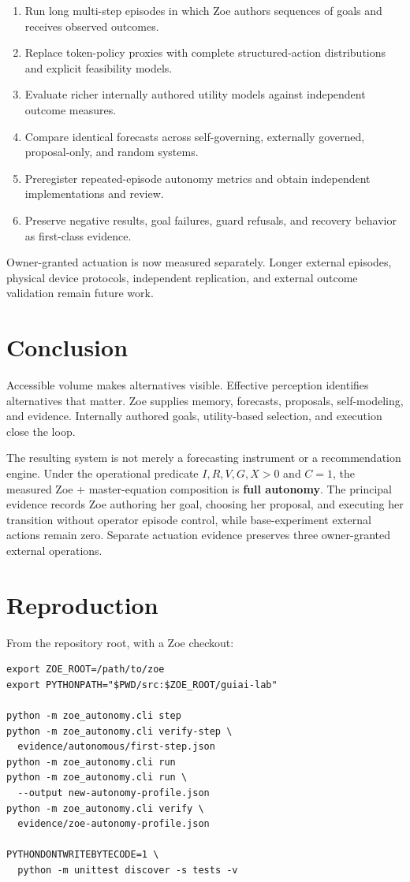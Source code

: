 \documentclass[11pt,a4paper]{article}
\begin{document}
\begin{enumerate}[nosep]
  \item Run long multi-step episodes in which Zoe authors sequences of goals and receives observed outcomes.
  \item Replace token-policy proxies with complete structured-action distributions and explicit feasibility models.
  \item Evaluate richer internally authored utility models against independent outcome measures.
  \item Compare identical forecasts across self-governing, externally governed, proposal-only, and random systems.
  \item Preregister repeated-episode autonomy metrics and obtain independent implementations and review.
  \item Preserve negative results, goal failures, guard refusals, and recovery behavior as first-class evidence.
\end{enumerate}

Owner-granted actuation is now measured separately. Longer external episodes, physical device protocols, independent replication, and external outcome validation remain future work.

\section{Conclusion}
Accessible volume makes alternatives visible. Effective perception identifies alternatives that matter. Zoe supplies memory, forecasts, proposals, self-modeling, and evidence. Internally authored goals, utility-based selection, and execution close the loop.

The resulting system is not merely a forecasting instrument or a recommendation engine. Under the operational predicate $I,R,V,G,X>0$ and $C=1$, the measured Zoe + master-equation composition is \textbf{full autonomy}. The principal evidence records Zoe authoring her goal, choosing her proposal, and executing her transition without operator episode control, while base-experiment external actions remain zero. Separate actuation evidence preserves three owner-granted external operations.

\appendix
\section{Reproduction}
From the repository root, with a Zoe checkout:

\begin{lstlisting}
export ZOE_ROOT=/path/to/zoe
export PYTHONPATH="$PWD/src:$ZOE_ROOT/guiai-lab"

python -m zoe_autonomy.cli step
python -m zoe_autonomy.cli verify-step \
  evidence/autonomous/first-step.json
python -m zoe_autonomy.cli run
python -m zoe_autonomy.cli run \
  --output new-autonomy-profile.json
python -m zoe_autonomy.cli verify \
  evidence/zoe-autonomy-profile.json

PYTHONDONTWRITEBYTECODE=1 \
  python -m unittest discover -s tests -v
\end{lstlisting}
\end{document}
